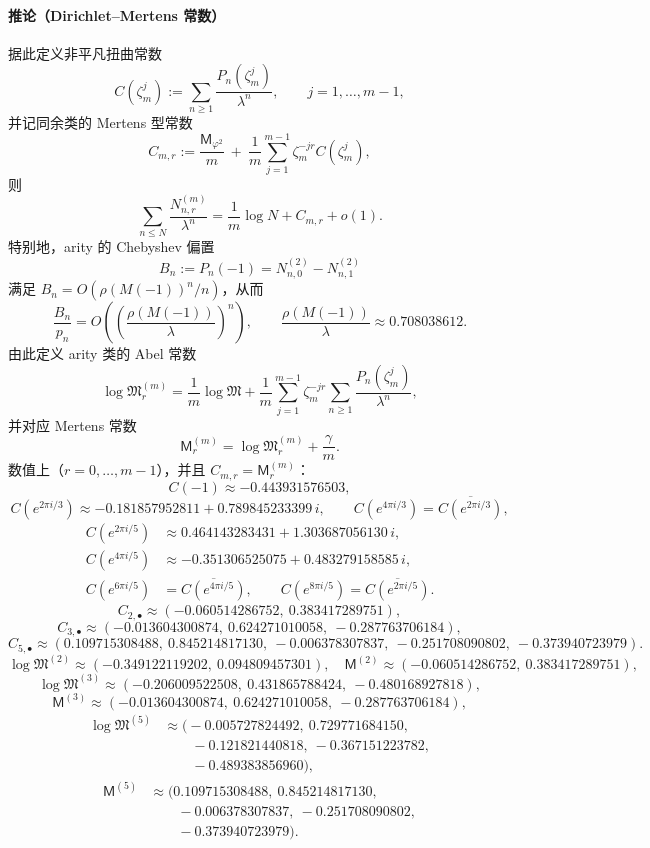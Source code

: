 \paragraph{推论（Dirichlet--Mertens 常数）}
据此定义非平凡扭曲常数
\[
C(\zeta_m^j):=\sum_{n\ge 1}\frac{P_n(\zeta_m^j)}{\lambda^n},
\qquad j=1,\dots,m-1,
\]
并记同余类的 Mertens 型常数
\[
C_{m,r}:=\frac{\mathsf{M}_{\varphi^2}}{m}
\ +\ \frac{1}{m}\sum_{j=1}^{m-1}\zeta_m^{-jr}C(\zeta_m^j),
\]
则
\[
\sum_{n\le N}\frac{N_{n,r}^{(m)}}{\lambda^n}
=\frac{1}{m}\log N+C_{m,r}+o(1).
\]
特别地，arity 的 Chebyshev 偏置
\[
B_n:=P_n(-1)=N_{n,0}^{(2)}-N_{n,1}^{(2)}
\]
满足 $B_n=O(\rho(M(-1))^n/n)$，从而
\[
\frac{B_n}{p_n}=O\!\left(\left(\frac{\rho(M(-1))}{\lambda}\right)^n\right),
\qquad
\frac{\rho(M(-1))}{\lambda}\approx 0.708038612.
\]
由此定义 arity 类的 Abel 常数
\[
\log\mathfrak{M}_r^{(m)}
=\frac{1}{m}\log\mathfrak{M}
+\frac{1}{m}\sum_{j=1}^{m-1}\zeta_m^{-jr}\sum_{n\ge 1}\frac{P_n(\zeta_m^j)}{\lambda^n},
\]
并对应 Mertens 常数
\[
\mathsf{M}_r^{(m)}=\log\mathfrak{M}_r^{(m)}+\frac{\gamma}{m}.
\]
数值上（$r=0,\dots,m-1$），并且 $C_{m,r}=\mathsf{M}_r^{(m)}$：
\[
C(-1)\approx -0.443931576503,
\]
\[
C(e^{2\pi i/3})\approx -0.181857952811+0.789845233399\,i,
\qquad
C(e^{4\pi i/3})=\overline{C(e^{2\pi i/3})},
\]
\[
\begin{aligned}
C(e^{2\pi i/5})&\approx 0.464143283431+1.303687056130\,i,\\
C(e^{4\pi i/5})&\approx -0.351306525075+0.483279158585\,i,\\
C(e^{6\pi i/5})&=\overline{C(e^{4\pi i/5})},\qquad
C(e^{8\pi i/5})=\overline{C(e^{2\pi i/5})}.
\end{aligned}
\]
\[
C_{2,\bullet}\approx(-0.060514286752,\ 0.383417289751),
\]
\[
C_{3,\bullet}\approx(-0.013604300874,\ 0.624271010058,\ -0.287763706184),
\]
\[
C_{5,\bullet}\approx(0.109715308488,\ 0.845214817130,\ -0.006378307837,\ -0.251708090802,\ -0.373940723979).
\]
\[
\log\mathfrak{M}^{(2)}\approx(-0.349122119202,\ 0.094809457301),
\quad
\mathsf{M}^{(2)}\approx(-0.060514286752,\ 0.383417289751),
\]
\[
\log\mathfrak{M}^{(3)}\approx(-0.206009522508,\ 0.431865788424,\ -0.480168927818),
\]
\[
\mathsf{M}^{(3)}\approx(-0.013604300874,\ 0.624271010058,\ -0.287763706184),
\]
\[
\begin{aligned}
\log\mathfrak{M}^{(5)}&\approx\bigl(-0.005727824492,\ 0.729771684150,\\
&\qquad -0.121821440818,\ -0.367151223782,\\
&\qquad -0.489383856960\bigr),
\end{aligned}
\]
\[
\begin{aligned}
\mathsf{M}^{(5)}&\approx\bigl(0.109715308488,\ 0.845214817130,\\
&\qquad -0.006378307837,\ -0.251708090802,\\
&\qquad -0.373940723979\bigr).
\end{aligned}
\]
